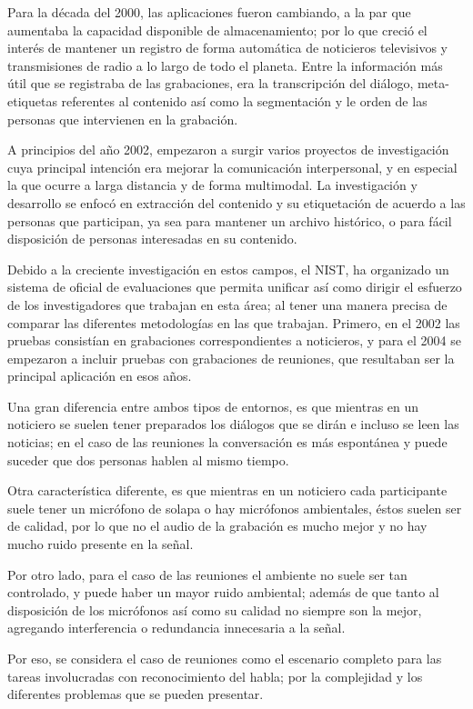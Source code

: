 Para la década del 2000, las aplicaciones fueron cambiando, a la par que aumentaba la capacidad disponible de almacenamiento; por lo que creció el interés de mantener un registro de forma automática de noticieros televisivos  y transmisiones de radio a lo largo de todo el planeta. Entre la información más útil que se registraba de las grabaciones, era la transcripción del diálogo, meta-etiquetas referentes al contenido así como la segmentación y le orden de las personas que intervienen en la grabación.

A principios del año 2002, empezaron a surgir varios proyectos de investigación cuya principal intención era mejorar la comunicación interpersonal, y en especial la que ocurre a larga distancia y de forma multimodal. La investigación y desarrollo se enfocó en extracción del contenido y su etiquetación de acuerdo a las personas que participan, ya sea para mantener un archivo histórico, o para fácil disposición de personas interesadas en su contenido.

Debido a la creciente investigación en estos campos, el \ac{NIST}, ha organizado un sistema de oficial de evaluaciones que permita  unificar así como dirigir el esfuerzo de los investigadores que trabajan en esta área; al tener una manera precisa de comparar las diferentes metodologías en las que trabajan. Primero, en el 2002 las pruebas consistían en grabaciones correspondientes a noticieros, y para el 2004 se empezaron a incluir pruebas con grabaciones de reuniones, que resultaban ser la principal aplicación en esos años.

Una gran diferencia entre ambos tipos de entornos, es que mientras en un noticiero se suelen tener preparados los diálogos que se dirán e incluso se leen las noticias; en el caso de las reuniones la conversación es más espontánea y puede suceder que dos personas hablen al mismo tiempo. 

Otra característica diferente, es que mientras en un noticiero cada participante suele tener un micrófono de solapa o hay micrófonos ambientales, éstos suelen ser de calidad, por lo que no el audio de la grabación es mucho mejor y no hay mucho ruido presente en la señal. 

Por otro lado, para el caso de las reuniones el ambiente no suele ser tan controlado, y puede haber un mayor ruido ambiental; además de que tanto al disposición de los micrófonos así como su calidad no siempre son la mejor, agregando interferencia o redundancia innecesaria a la señal.

Por eso, se considera el caso de reuniones como el escenario completo para las tareas involucradas con reconocimiento del habla; por la complejidad y los diferentes problemas que se pueden presentar.

